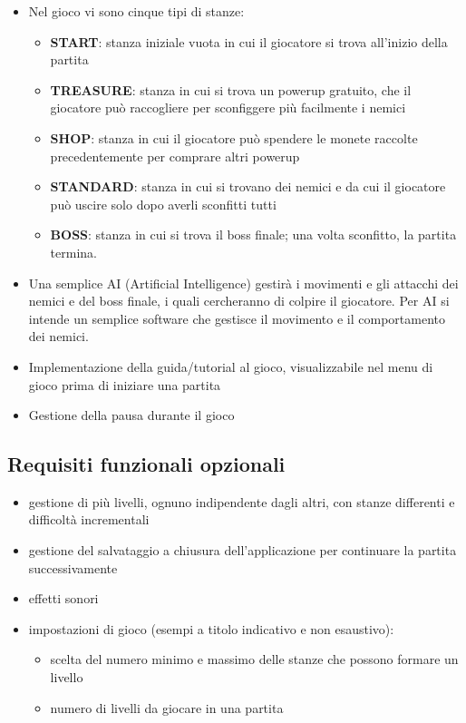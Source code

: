 \documentclass[a4paper,12pt]{report}
\begin{document}
\begin{itemize}
    \item Nel gioco vi sono cinque tipi di stanze:
    \begin{itemize}
        \item \textbf{START}: stanza iniziale vuota in cui il giocatore si trova all'inizio della partita
        \item \textbf{TREASURE}: stanza in cui si trova un powerup gratuito, che il giocatore può raccogliere per sconfiggere più facilmente i nemici
        \item \textbf{SHOP}: stanza in cui il giocatore può spendere le monete raccolte precedentemente per comprare altri powerup
        \item \textbf{STANDARD}: stanza in cui si trovano dei nemici e da cui il giocatore può uscire solo dopo averli sconfitti tutti
        \item \textbf{BOSS}: stanza in cui si trova il boss finale; una volta sconfitto, la partita termina.
    \end{itemize}
    \item Una semplice AI (Artificial Intelligence) gestirà i movimenti e gli attacchi dei nemici e del boss finale, i quali cercheranno di colpire il giocatore. Per AI si intende un semplice software che gestisce il movimento e il comportamento dei nemici.
    \item Implementazione della guida/tutorial al gioco, visualizzabile nel menu di gioco prima di iniziare una partita
    \item Gestione della pausa durante il gioco
\end{itemize}

\subsection*{Requisiti funzionali opzionali}
\begin{itemize}
    \item gestione di più livelli, ognuno indipendente dagli altri, con stanze differenti e difficoltà incrementali
    \item gestione del salvataggio a chiusura dell'applicazione per continuare la partita successivamente
    \item effetti sonori
    \item impostazioni di gioco (esempi a titolo indicativo e non esaustivo): \begin{itemize}
        \item scelta del numero minimo e massimo delle stanze che possono formare un livello
        \item numero di livelli da giocare in una partita
    \end{itemize}
\end{itemize}
\end{document}

